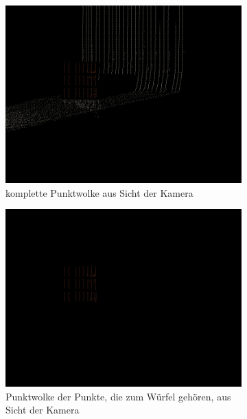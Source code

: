 \documentclass[ngerman,a4paper,parskip=half]{scrartcl}
\begin{document}
\begin{figure}[H]
	\centering
	\begin{subfigure}{0.45\textwidth}
		\includegraphics[width=\textwidth]{includes/free_orange_300_cam.png}
		\caption{komplette Punktwolke aus Sicht der Kamera}
	\end{subfigure}
	\hfill
	\begin{subfigure}{0.45\textwidth}
		\includegraphics[width=\textwidth]{includes/free_only_orange_300_cam.png}
		\caption{Punktwolke der Punkte, die zum Würfel gehören, aus Sicht der Kamera}
	\end{subfigure}
	\begin{subfigure}{0.45\textwidth}

\end{subfigure}
\end{figure}
\end{document}
